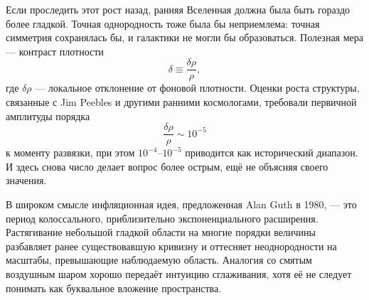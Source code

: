 Если проследить этот рост назад, ранняя Вселенная должна была быть гораздо более гладкой. Точная однородность тоже была бы неприемлема: точная симметрия сохранялась бы, и галактики не могли бы образоваться. Полезная мера — контраст плотности
\begin{equation}
\delta\equiv\frac{\delta\rho}{\rho},
\end{equation}
где \(\delta\rho\) — локальное отклонение от фоновой плотности. Оценки роста структуры, связанные с Jim Peebles и другими ранними космологами, требовали первичной амплитуды порядка
\begin{equation}
\boxed{\frac{\delta\rho}{\rho}\sim10^{-5}}
\end{equation}
к моменту развязки, при этом \(10^{-4}\)--\(10^{-5}\) приводится как исторический диапазон. И здесь снова число делает вопрос более острым, ещё не объясняя своего значения.

В широком смысле инфляционная идея, предложенная Alan Guth в 1980, — это период колоссального, приблизительно экспоненциального расширения. Растягивание небольшой гладкой области на многие порядки величины разбавляет ранее существовавшую кривизну и оттесняет неоднородности на масштабы, превышающие наблюдаемую область. Аналогия со смятым воздушным шаром хорошо передаёт интуицию сглаживания, хотя её не следует понимать как буквальное вложение пространства.

\begin{classroomqa}
\end{classroomqa}

\begin{classroomqa}
\end{classroomqa}

